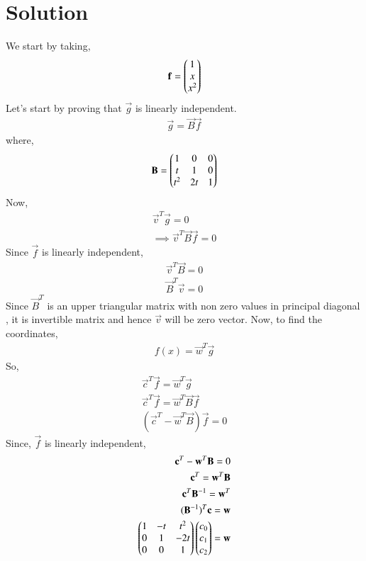 \documentclass[journal,12pt,twocolumn]{IEEEtran}
\begin{document}
   \section{\textbf{Solution}}
   We start by taking,\begin{align}\mathbf{f}=\begin{pmatrix}1\\x\\x^2\end{pmatrix}\end{align}
   Let's start by proving that $\vec{g}$ is linearly independent.
    \begin{align}
    \vec{g}=\vec{B}\vec{f}
    \end{align}
    where,
    \begin{align}
    \mathbf{B}=\begin{pmatrix}1&0&0\\t&1&0\\t^2&2t&1\end{pmatrix}
    \end{align}
    Now,
    \begin{align}
    \vec{v}^T\vec{g}=0\\
    \implies \vec{v}^T\vec{B}\vec{f}=0
    \end{align}
    Since $\vec{f}$ is linearly independent,
    \begin{align}
     \vec{v}^T\vec{B}=0\\
     \vec{B}^T\vec{v}=0
    \end{align}
   Since $\vec{B}^T$ is an upper triangular matrix with non zero values in principal diagonal  , it is invertible matrix and hence $\vec{v}$ will be zero vector.
   Now, to find the coordinates,
  \begin{align}
  f(x)=\vec{w}^T\vec{g}
  \end{align}
  So,
  \begin{align}
  \vec{c}^T\vec{f}=\vec{w}^T\vec{g}\\
\vec{c}^T\vec{f}=\vec{w}^T\vec{B}\vec{f}\\
(\vec{c}^T-\vec{w}^T\vec{B})\vec{f}=0
  \end{align} 
  Since, $\vec{f}$ is linearly independent,
  \begin{align}
  \mathbf{c}^T-\mathbf{w}^T\mathbf{B}=0\\
  \mathbf{c}^T=\mathbf{w}^T\mathbf{B}\\
  \mathbf{c}^T\mathbf{B}^{-1}=\mathbf{w}^T\\
   (\mathbf{B}^{-1})^T\mathbf{c}=\mathbf{w}\\
  \begin{pmatrix}1&-t&t^2\\0&1&-2t\\0&0&1\end{pmatrix}\begin{pmatrix}c_0\\c_1\\c_2\end{pmatrix}=\mathbf{w}
  \end{align} 
\end{document}
